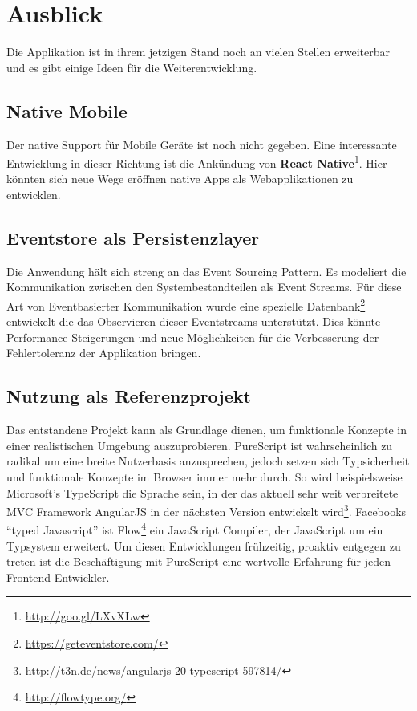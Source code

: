\section{Ausblick}
Die Applikation ist in ihrem jetzigen Stand noch an vielen Stellen
erweiterbar und es gibt einige Ideen für die Weiterentwicklung.

\subsection{Native Mobile}
Der native Support für Mobile Geräte ist noch nicht gegeben. Eine
interessante Entwicklung in dieser Richtung ist die Ankündung von
\textbf{React Native}\footnote{\url{http://goo.gl/LXvXLw}}.
Hier könnten sich neue Wege eröffnen native Apps als Webapplikationen
zu entwicklen.

\subsection{Eventstore als Persistenzlayer}
Die Anwendung hält sich streng an das \gls{Event Sourcing} Pattern. Es
modeliert die Kommunikation zwischen den Systembestandteilen als Event
Streams. Für diese Art von Eventbasierter Kommunikation wurde eine spezielle
Datenbank\footnote{\url{https://geteventstore.com/}} entwickelt die
das Observieren dieser Eventstreams unterstützt. Dies könnte
Performance Steigerungen und neue Möglichkeiten für die Verbesserung
der Fehlertoleranz der Applikation bringen.

\subsection{Nutzung als Referenzprojekt}
Das entstandene Projekt kann als Grundlage dienen, um
funktionale Konzepte in einer realistischen Umgebung auszuprobieren.
PureScript ist wahrscheinlich zu radikal um eine breite Nutzerbasis
anzusprechen, jedoch setzen sich Typsicherheit und funktionale
Konzepte im Browser immer mehr durch. So wird beispielsweise Microsoft's
TypeScript die Sprache sein, in der das aktuell sehr weit verbreitete MVC
Framework AngularJS in der nächsten Version entwickelt wird\footnote{\url{http://t3n.de/news/angularjs-20-typescript-597814/}}.
Facebooks ``typed Javascript'' ist
Flow\footnote{\url{http://flowtype.org/}} ein JavaScript Compiler, der
JavaScript um ein Typsystem erweitert. Um diesen Entwicklungen
frühzeitig, proaktiv entgegen zu treten ist die Beschäftigung mit
PureScript eine wertvolle Erfahrung für jeden Frontend-Entwickler.

